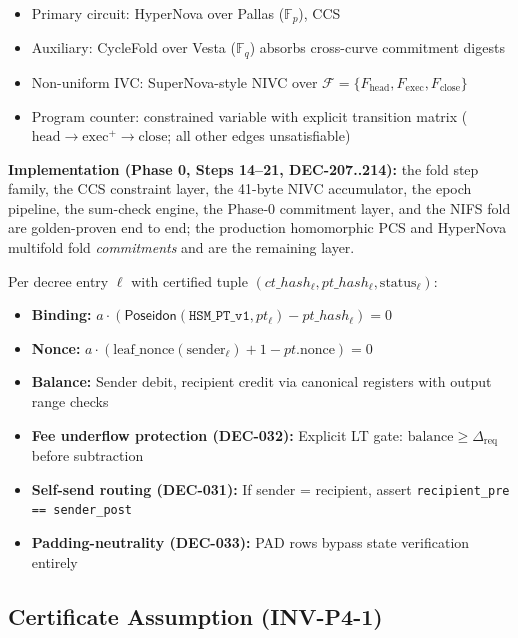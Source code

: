 \documentclass[11pt, a4paper]{article}
\begin{document}
\begin{itemize}
    \item Primary circuit: HyperNova over Pallas ($\mathbb{F}_p$), CCS
    \item Auxiliary: CycleFold over Vesta ($\mathbb{F}_q$) absorbs cross-curve commitment digests
    \item Non-uniform IVC: SuperNova-style NIVC over $\mathcal{F} = \{F_{\text{head}}, F_{\text{exec}}, F_{\text{close}}\}$     \item Program counter: constrained variable with explicit transition matrix ($\text{head} \to \text{exec}^+ \to \text{close}$; all other edges unsatisfiable)
\end{itemize}

\textbf{Implementation (Phase 0, Steps 14--21, DEC-207..214):} the fold step family, the CCS
constraint layer, the 41-byte NIVC accumulator, the epoch pipeline, the sum-check engine, the
Phase-0 commitment layer, and the NIFS fold are golden-proven end to end; the production
homomorphic PCS and HyperNova multifold fold \emph{commitments} and are the remaining layer.



Per decree entry $\ell$ with certified tuple $(ct\_hash_\ell, pt\_hash_\ell, \text{status}_\ell)$:

\begin{itemize}
    \item \textbf{Binding:} $a \cdot (\textsf{Poseidon}(\texttt{HSM\_PT\_v1}, pt_\ell) - pt\_hash_\ell) = 0$     \item \textbf{Nonce:} $a \cdot (\text{leaf\_nonce}(\text{sender}_\ell) + 1 - pt.\text{nonce}) = 0$     \item \textbf{Balance:} Sender debit, recipient credit via canonical registers with output range checks
    \item \textbf{Fee underflow protection (DEC-032):} Explicit LT gate: $\text{balance} \ge \Delta_{\text{req}}$ before subtraction
    \item \textbf{Self-send routing (DEC-031):} If sender = recipient, assert \texttt{recipient\_pre == sender\_post}
    \item \textbf{Padding-neutrality (DEC-033):} PAD rows bypass state verification entirely
\end{itemize}

\subsection{Certificate Assumption (INV-P4-1)}
\end{document}

